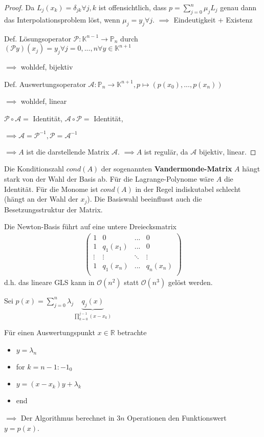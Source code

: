 \begin{proof}
	Da $L_j(x_k) = \delta_{jk} \forall j,k$ ist offensichtlich, dass $p=\sum_{j=0}^{n} \mu_j L_j$ genau dann das Interpolationsproblem löst, wenn $\mu_j=y_j \forall j$. $\implies$ Eindeutigkeit + Existenz
	
	Def. Lösungsoperator $\mathcal{P}: \mathbb{K}^{n-1} \rightarrow \mathbb{P}_n$ durch $(\mathcal{P}y)(x_j) = y_j \forall j=0, ..., n \forall y \in \mathbb{K}^{n+1}$
	
	$\implies$ wohldef, bijektiv
	
	Def. Auswertungsoperator $\mathcal{A}: \mathbb{P}_n \rightarrow \mathbb{K}^{n+1}, p \mapsto (p(x_0), ..., p(x_n))$
	
	$\implies$ wohldef, linear
	
	$\mathcal{P} \circ \mathcal{A} =$ Identität, $\mathcal{A} \circ \mathcal{P} =$ Identität,
	
	$\implies \mathcal{A} = \mathcal{P}^{-1}, \mathcal{P} = \mathcal{A}^{-1}$
	
	$\implies A$ ist die darstellende Matrix $\mathcal{A}$. $\implies A$ ist regulär, da $\mathcal{A}$ bijektiv, linear.
\end{proof}

\begin{remark}
	Die Konditionszahl $cond(A)$ der sogenannten \textbf{Vandermonde-Matrix} $A$ hängt stark von der Wahl der Basis ab. Für die Lagrange-Polynome wäre $A$ die Identität. Für die Monome ist $cond(A)$ in der Regel indiskutabel schlecht (hängt an der Wahl der $x_j$). Die Basiswahl beeinflusst auch die Besetzungsstruktur der Matrix.
\end{remark}

\begin{example}
	Die Newton-Basis führt auf eine untere Dreiecksmatrix
	\begin{align*}
		\left(\begin{matrix}
			1 & 0 & ... & 0\\
			1 & q_1(x_1) & ... & 0\\
			\vdots & \vdots & \ddots & \vdots\\
			1 & q_1(x_n) & ... & q_n(x_n)\\
		\end{matrix}\right)
	\end{align*}
	d.h. das lineare GLS kann in $\mathcal{O}(n^2)$ statt $\mathcal{O}(n^3)$ gelöst werden.
\end{example}

\begin{lemma}
	Sei $p(x) = \sum_{j=0}^{n} \lambda_j \underbrace{q_j(x)}_{\prod_{k=0}^{j-1}(x-x_k)}$
	
	Für einen Auswertungspunkt $x \in \mathbb{R}$ betrachte
	\begin{itemize}
		\item $y = \lambda_n$
		\item for $k=n-1:-1_0$
		\item $y = (x-x_k)y + \lambda_k$
		\item end
	\end{itemize}
	
	$\implies$ Der Algorithmus berechnet in $3n$ Operationen den Funktionswert $y=p(x)$.
\end{lemma}

